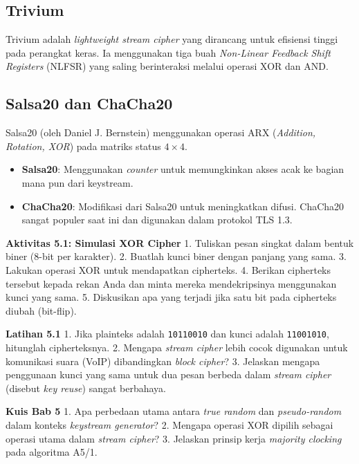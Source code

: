\documentclass[../main.tex]{subfiles}
\begin{document}
\subsection{Trivium}
Trivium adalah \textit{lightweight stream cipher} yang dirancang untuk efisiensi tinggi pada perangkat keras. Ia menggunakan tiga buah \textit{Non-Linear Feedback Shift Registers} (NLFSR) yang saling berinteraksi melalui operasi XOR dan AND.

\subsection{Salsa20 dan ChaCha20}
Salsa20 (oleh Daniel J. Bernstein) menggunakan operasi ARX (\textit{Addition, Rotation, XOR}) pada matriks status $4 \times 4$.
\begin{itemize}
    \item \textbf{Salsa20}: Menggunakan \textit{counter} untuk memungkinkan akses acak ke bagian mana pun dari keystream.
    \item \textbf{ChaCha20}: Modifikasi dari Salsa20 untuk meningkatkan difusi. ChaCha20 sangat populer saat ini dan digunakan dalam protokol TLS 1.3.
\end{itemize}

\begin{obeactivity}
\textbf{Aktivitas 5.1: Simulasi XOR Cipher}
1. Tuliskan pesan singkat dalam bentuk biner (8-bit per karakter).
2. Buatlah kunci biner dengan panjang yang sama.
3. Lakukan operasi XOR untuk mendapatkan cipherteks.
4. Berikan cipherteks tersebut kepada rekan Anda dan minta mereka mendekripsinya menggunakan kunci yang sama.
5. Diskusikan apa yang terjadi jika satu bit pada cipherteks diubah (bit-flip).
\end{obeactivity}

\begin{obereflection}
\textbf{Latihan 5.1}
1. Jika plainteks adalah \texttt{10110010} dan kunci adalah \texttt{11001010}, hitunglah cipherteksnya.
2. Mengapa \textit{stream cipher} lebih cocok digunakan untuk komunikasi suara (VoIP) dibandingkan \textit{block cipher}?
3. Jelaskan mengapa penggunaan kunci yang sama untuk dua pesan berbeda dalam \textit{stream cipher} (disebut \textit{key reuse}) sangat berbahaya.
\end{obereflection}

\begin{obeassessment}
\textbf{Kuis Bab 5}
1. Apa perbedaan utama antara \textit{true random} dan \textit{pseudo-random} dalam konteks \textit{keystream generator}?
2. Mengapa operasi XOR dipilih sebagai operasi utama dalam \textit{stream cipher}?
3. Jelaskan prinsip kerja \textit{majority clocking} pada algoritma A5/1.
\end{obeassessment}
\end{document}
